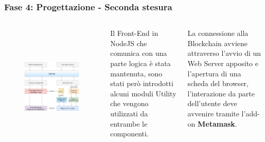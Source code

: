 \documentclass{beamer}
\begin{document}
\begin{frame}
	\frametitle{Fase 4: Progettazione - Seconda stesura}
	\begin{columns}
			\begin{figure}
				\includegraphics[width=1\textwidth, height=1.05\textwidth]{figures/architecture2.png}
			\end{figure}
		Il Front-End in NodeJS che comunica con una parte logica è stata mantenuta, sono stati però introdotti alcuni moduli Utility che vengono utilizzati da entrambe le componenti.

		La connessione alla Blockchain avviene attraverso l’avvio di un Web Server apposito e l’apertura di una scheda del browser, l’interazione da parte dell’utente deve avvenire tramite l’add-on \textbf{Metamask}.
	\end{columns}
\end{frame}
\end{document}
